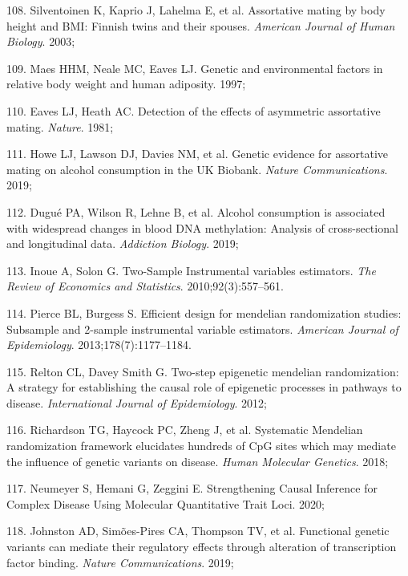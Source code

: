 \documentclass[11pt,oneside]{bristolthesis}
\newenvironment{cslreferences}%
  {}%
  {\par}
\begin{document}
\begin{cslreferences}
\leavevmode\hypertarget{ref-Silventoinen2003}{}%
108. Silventoinen K, Kaprio J, Lahelma E, et al. Assortative mating by body height and BMI: Finnish twins and their spouses. \emph{American Journal of Human Biology}. 2003;

\leavevmode\hypertarget{ref-Maes1997}{}%
109. Maes HHM, Neale MC, Eaves LJ. Genetic and environmental factors in relative body weight and human adiposity. 1997;

\leavevmode\hypertarget{ref-Eaves1981}{}%
110. Eaves LJ, Heath AC. Detection of the effects of asymmetric assortative mating. \emph{Nature}. 1981;

\leavevmode\hypertarget{ref-Howe2019}{}%
111. Howe LJ, Lawson DJ, Davies NM, et al. Genetic evidence for assortative mating on alcohol consumption in the UK Biobank. \emph{Nature Communications}. 2019;

\leavevmode\hypertarget{ref-Dugue2019}{}%
112. Dugué PA, Wilson R, Lehne B, et al. Alcohol consumption is associated with widespread changes in blood DNA methylation: Analysis of cross-sectional and longitudinal data. \emph{Addiction Biology}. 2019;

\leavevmode\hypertarget{ref-Inoue2010}{}%
113. Inoue A, Solon G. Two-Sample Instrumental variables estimators. \emph{The Review of Economics and Statistics}. 2010;92(3):557--561.

\leavevmode\hypertarget{ref-Pierce2013}{}%
114. Pierce BL, Burgess S. Efficient design for mendelian randomization studies: Subsample and 2-sample instrumental variable estimators. \emph{American Journal of Epidemiology}. 2013;178(7):1177--1184.

\leavevmode\hypertarget{ref-Relton2012}{}%
115. Relton CL, Davey Smith G. Two-step epigenetic mendelian randomization: A strategy for establishing the causal role of epigenetic processes in pathways to disease. \emph{International Journal of Epidemiology}. 2012;

\leavevmode\hypertarget{ref-Richardson2018}{}%
116. Richardson TG, Haycock PC, Zheng J, et al. Systematic Mendelian randomization framework elucidates hundreds of CpG sites which may mediate the influence of genetic variants on disease. \emph{Human Molecular Genetics}. 2018;

\leavevmode\hypertarget{ref-Neumeyer2020}{}%
117. Neumeyer S, Hemani G, Zeggini E. Strengthening Causal Inference for Complex Disease Using Molecular Quantitative Trait Loci. 2020;

\leavevmode\hypertarget{ref-Johnston2019}{}%
118. Johnston AD, Simões-Pires CA, Thompson TV, et al. Functional genetic variants can mediate their regulatory effects through alteration of transcription factor binding. \emph{Nature Communications}. 2019;


\end{cslreferences}
\end{document}

